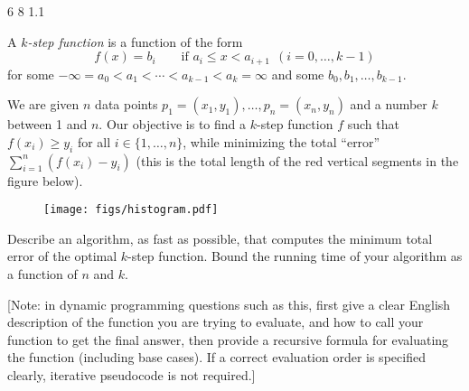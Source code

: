 \ifx\AllTogetherMode\undefined%
%
{}%
{}%
\fi

\HomeworkStart%
{6} %
{8} %
{1.1} %

\SaveIndent%

\newcommand{\EE}{\mathcal{E}}%
\begin{questions}[start=16]
    \RestoreIndent%
    \medskip%
    
    
    \item {}%
    {%
       A \emph{$k$-step function} is a function of the form
       \[ f(x) = b_i \qquad\mbox{if
              $a_i\le x < a_{i+1}\ \ (i=0,\ldots,k-1)$} \] for some
       $-\infty=a_0<a_1<\cdots<a_{k-1}<a_k=\infty$ and some
       $b_0,b_1,\ldots,b_{k-1}$.
       
       We are given $n$ data points
       $p_1=(x_1,y_1),\ldots,p_n=(x_n,y_n)$ and a number $k$ between 1
       and $n$.  Our objective is to find a $k$-step function $f$ such
       that $f(x_i)\ge y_i$ for all $i\in\{1,\ldots,n\}$, while
       minimizing the total ``error'' $\sum_{i=1}^n (f(x_i)-y_i)$
       (this is the total length of the red vertical segments in the
       figure below).
       
       \begin{figure}[h]
           \centering \texttt{[image: figs/histogram.pdf]}
       \end{figure}
       
       \begin{questions}
           \item {} Describe an algorithm, as fast as
           possible, that computes the minimum total error of the
           optimal $k$-step function. Bound the running time of your
           algorithm as a function of $n$ and $k$.
           
           [Note: in dynamic programming questions such as this, first
           give a clear English description of the function you are
           trying to evaluate, and how to call your function to get
           the final answer, then provide a recursive formula for
           evaluating the function (including base cases).  If a
           correct evaluation order is specified clearly, iterative
           pseudocode is not required.]
           

\end{questions}}
\end{questions}
